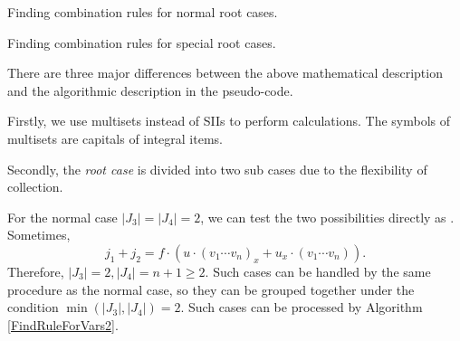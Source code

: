 \begin{algorithm}
\caption{Finding combination rules for normal root cases.}
\label{FindRuleForVars2}
\end{algorithm}

\begin{algorithm}
\caption{Finding combination rules for special root cases.}
\label{FindRuleForVars1}
\end{algorithm}

There are three major differences between the above mathematical description and the algorithmic description in the pseudo-code. 

Firstly, we use multisets instead of SIIs to perform calculations. The symbols of multisets are capitals of integral items. 

Secondly, the \emph{root case} is divided into two sub cases due to the flexibility of collection. 

For the normal case $|J_3|=|J_4|=2$, we can test the two possibilities directly as  . Sometimes, 
\begin{equation}
j_1+j_2 = f \cdot ( u \cdot (v_1 \cdots v_n)_x +  u_x \cdot (v_1 \cdots v_n ) ).
\end{equation}
Therefore, $|J_3|=2,|J_4|=n+1\ge 2$. Such cases can be handled by the same procedure as the normal case, so they can be grouped together under the condition $\min(|J_3|,|J_4|)=2$. Such cases can be processed by Algorithm \ref{FindRuleForVars2}.


